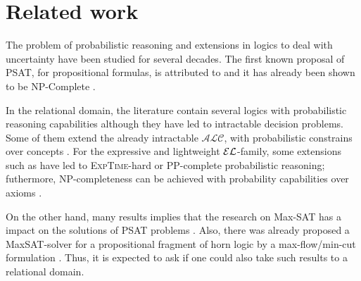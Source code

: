 
\chapter{Related work}
\label{cap:relatedwork}

The problem of probabilistic reasoning and extensions in logics to deal with uncertainty have been studied for several decades. The first known proposal of PSAT, for propositional formulas, is attributed to \citet{boole1854investigation} and it has already been shown to be NP-Complete \citep{georgakopoulos1988probabilistic}.

In the relational domain, the literature contain several logics with probabilistic reasoning capabilities although they have led to intractable decision problems.  Some of them extend the already intractable $\mathcal{ALC}$, with probabilistic constrains over concepts \citep{heinsohn1994probabilistic, lukasiewicz2008expressive, GutierrezBasultoEA11}. For the expressive and lightweight $\mathcal{EL}$-family, some extensions such as \citet{gutierrez2017probabilistic,ceylan2017bayesian} have led to \textsc{ExpTime}-hard or PP-complete probabilistic reasoning; futhermore, NP-completeness can be achieved with probability capabilities over axioms \citep{Fin2019b}.

On the other hand, many results implies that the research on Max-SAT has a impact on the solutions of PSAT problems \citep{andersen2001easy}. Also, there was already proposed a MaxSAT-solver for a propositional fragment of horn logic by a max-flow/min-cut formulation \citep{jaumard1987complexity}. Thus, it is expected to ask if one could also take such results to a relational domain.
